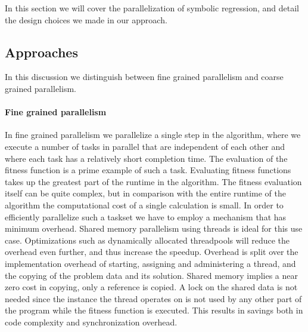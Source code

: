 In this section we will cover the parallelization of symbolic regression, and detail the design choices we made in our approach.

\subsection{Approaches}
In this discussion we distinguish between fine grained parallelism and coarse grained parallelism. 

\paragraph{Fine grained parallelism}
In fine grained parallelism we parallelize a single step in the algorithm, where we execute a number of tasks in parallel that are independent of each other and where each task has a relatively short completion time. 
The evaluation of the fitness function is a prime example of such a task. Evaluating fitness functions takes up the greatest part of the runtime in the algorithm.
The fitness evaluation itself can be quite complex, but in comparison with the entire runtime of the algorithm the computational cost of a single calculation is small. In order to efficiently parallelize such a taskset we have to employ a mechanism that has minimum overhead. Shared memory parallelism using threads is ideal for this use case. Optimizations such as dynamically allocated threadpools will reduce the overhead even further, and thus increase the speedup. Overhead is split over the implementation overhead of starting, assigning and administering a thread, and the copying of the problem data and its solution. Shared memory implies a near zero cost in copying, only a reference is copied. A lock on the shared data is not needed since the instance the thread operates on is not used by any other part of the program while the fitness function is executed. This results in savings both in code complexity and synchronization overhead.

